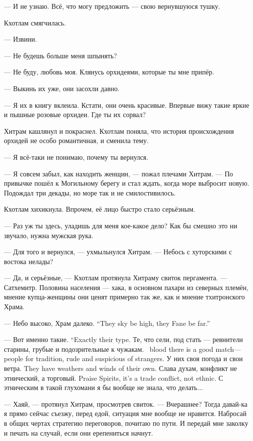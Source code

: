 --- И не узнаю.
Всё, что могу предложить --- свою вернувшуюся тушку.

Кхотлам смягчилась.

--- Извини.

--- Не будешь больше меня шпынять?

--- Не буду, любовь моя.
Клянусь орхидеями, которые ты мне припёр.

--- Выкинь их уже, они засохли давно.

--- Я их в книгу вклеила.
Кстати, они очень красивые.
Впервые вижу такие яркие и пышные розовые орхидеи.
Где ты их сорвал?

Хитрам кашлянул и покраснел.
Кхотлам поняла, что история происхождения орхидей не особо романтичная, и сменила тему.

--- Я всё-таки не понимаю, почему ты вернулся.

--- Я совсем забыл, как находить женщин, --- пожал плечами Хитрам.
--- По привычке пошёл к Могильному берегу и стал ждать, когда море выбросит новую.
Подождал три декады, но море так и не смилостивилось.

Кхотлам хихикнула.
Впрочем, её лицо быстро стало серьёзным.

--- Раз уж ты здесь, уладишь для меня кое-какое дело?
Как бы смешно это ни звучало, нужна мужская рука.

--- Для того и вернулся, --- ухмыльнулся Хитрам.
--- Небось с хуторскими с востока нелады?

--- Да, и серьёзные, --- Кхотлам протянула Хитраму свиток пергамента.
--- Сатхемитр.
Половина населения --- хака, в основном пахари из северных племён, мнение купца-женщины они ценят примерно так же, как и мнение тхитронского Храма.

{--- Небо высоко, Храм далеко.}
{``They sky be high, they Fane be far.''}

{--- Вот именно такие.}
{``Exactly their type.}
{Те, что сели, под стать --- ревнители старины, грубые и подозрительные к чужакам.}
{\Seli\ blood there is a good match---people for tradition, rude and suspicious of strangers.}
{У них своя погода и свои ветра.}
{They have weathers and winds of their own.}
{Слава духам, конфликт не этнический, а торговый.}
{Praise Spirits, it's a trade conflict, not ethnic.}
С этническим в такой глухомани я бы вообще не знала, что делать...

--- Хаяй, --- протянул Хитрам, просмотрев свиток.
--- Вчерашнее?
Тогда давай-ка я прямо сейчас съезжу, перед едой, ситуация мне вообще не нравится.
Набросай в общих чертах стратегию переговоров, почитаю по пути.
И передай мне заколку и печать на случай, если они ерепениться начнут.

